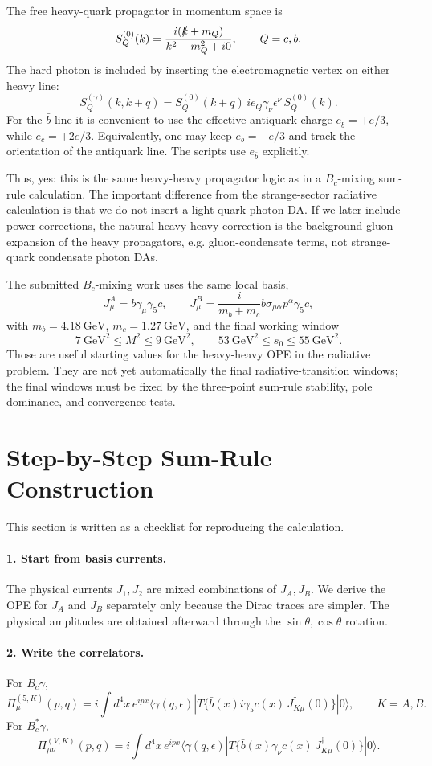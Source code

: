\documentclass[11pt]{article}
\newcommand{\Slash}[1]{\slashed{#1}}
\newcommand{\GeV}{\mathrm{GeV}}
\begin{document}
The free heavy-quark propagator in momentum space is
\[
S_Q^{(0)}(k)=\frac{i(\Slash{k}+m_Q)}{k^2-m_Q^2+i0},
\qquad Q=c,b .
\]
The hard photon is included by inserting the electromagnetic vertex on either
heavy line:
\[
S_Q^{(\gamma)}(k,k+q)=
S_Q^{(0)}(k+q)\,i e_Q\gamma_\nu\epsilon^\nu\,S_Q^{(0)}(k).
\]
For the \(\bar b\) line it is convenient to use the effective antiquark charge
\(e_{\bar b}=+e/3\), while \(e_c=+2e/3\).  Equivalently, one may keep
\(e_b=-e/3\) and track the orientation of the antiquark line.  The scripts use
\(e_{\bar b}\) explicitly.

Thus, yes: this is the same heavy-heavy propagator logic as in a \(B_c\)-mixing
sum-rule calculation.  The important difference from the strange-sector
radiative calculation is that we do not insert a light-quark photon DA.  If we
later include power corrections, the natural heavy-heavy correction is the
background-gluon expansion of the heavy propagators, e.g. gluon-condensate
terms, not strange-quark condensate photon DAs.

The submitted \(B_c\)-mixing work uses the same local basis,
\[
J_\mu^A=\bar b\gamma_\mu\gamma_5c,\qquad
J_\mu^B=\frac{i}{m_b+m_c}\bar b\sigma_{\mu\alpha}p^\alpha\gamma_5c,
\]
with \(m_b=4.18~\GeV\), \(m_c=1.27~\GeV\), and the final working window
\[
7~\GeV^2\le M^2\le 9~\GeV^2,\qquad
53~\GeV^2\le s_0\le 55~\GeV^2 .
\]
Those are useful starting values for the heavy-heavy OPE in the radiative
problem.  They are not yet automatically the final radiative-transition
windows; the final windows must be fixed by the three-point sum-rule stability,
pole dominance, and convergence tests.

\section{Step-by-Step Sum-Rule Construction}

This section is written as a checklist for reproducing the calculation.

\paragraph{1. Start from basis currents.}
The physical currents \(J_1,J_2\) are mixed combinations of \(J_A,J_B\).  We
derive the OPE for \(J_A\) and \(J_B\) separately only because the Dirac traces
are simpler.  The physical amplitudes are obtained afterward through the
\(\sin\theta,\cos\theta\) rotation.

\paragraph{2. Write the correlators.}
For \(B_c\gamma\),
\[
\Pi_\mu^{(5,K)}(p,q)=
i\int d^4x\,e^{ipx}
\langle\gamma(q,\epsilon)|
T\{\bar b(x)i\gamma_5c(x)\,J_{K\mu}^\dagger(0)\}|0\rangle ,
\qquad K=A,B .
\]
For \(B_c^\ast\gamma\),
\[
\Pi_{\mu\nu}^{(V,K)}(p,q)=
i\int d^4x\,e^{ipx}
\langle\gamma(q,\epsilon)|
T\{\bar b(x)\gamma_\nu c(x)\,J_{K\mu}^\dagger(0)\}|0\rangle .
\]
\end{document}
